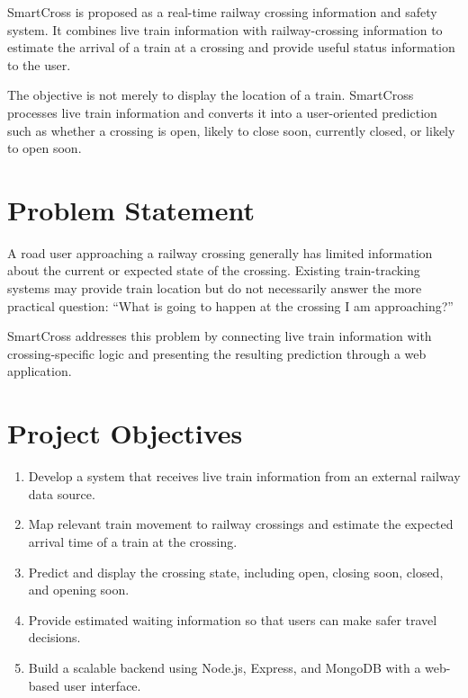 \documentclass[12pt,a4paper]{report}
\begin{document}
SmartCross is proposed as a real-time railway crossing information and safety
system. It combines live train information with railway-crossing information to
estimate the arrival of a train at a crossing and provide useful status information
to the user.

The objective is not merely to display the location of a train. SmartCross processes
live train information and converts it into a user-oriented prediction such as
whether a crossing is open, likely to close soon, currently closed, or likely to
open soon.

\section{Problem Statement}

A road user approaching a railway crossing generally has limited information about
the current or expected state of the crossing. Existing train-tracking systems may
provide train location but do not necessarily answer the more practical question:
``What is going to happen at the crossing I am approaching?''

SmartCross addresses this problem by connecting live train information with
crossing-specific logic and presenting the resulting prediction through a web
application.

\section{Project Objectives}

\begin{enumerate}
  \item Develop a system that receives live train information from an external
        railway data source.
  \item Map relevant train movement to railway crossings and estimate the expected
        arrival time of a train at the crossing.
  \item Predict and display the crossing state, including open, closing soon,
        closed, and opening soon.
  \item Provide estimated waiting information so that users can make safer travel
        decisions.
  \item Build a scalable backend using Node.js, Express, and MongoDB with a
        web-based user interface.
\end{enumerate}

\end{document}
